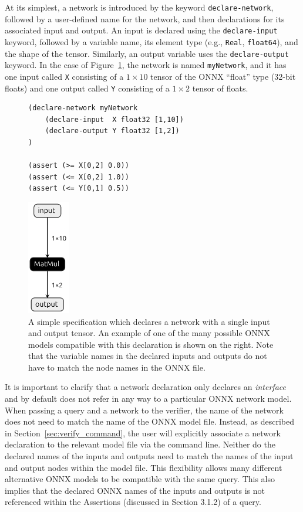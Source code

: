  At its simplest, a network is introduced by the keyword \texttt{declare-network}, followed by a user-defined name for the network, and then declarations for its associated input and output. An input is declared using the \texttt{declare-input} keyword, followed by a variable name, its element type (e.g., \texttt{Real}, \texttt{float64}), 
and the shape of the tensor. Similarly, an output variable uses the \texttt{declare-output} keyword. In the case of Figure~\ref{fig:simple-query}, the network is named \texttt{myNetwork}, and it has one input called \texttt{X} consisting of a $1 \times 10$ tensor of the ONNX ``float'' type (32-bit floats) and one output called \texttt{Y} consisting of a $1 \times 2$ tensor of floats. 
\begin{figure}[t]
    \begin{minipage}[c]{0.62\textwidth}
        \begin{lstlisting}[style=lbnf]
(declare-network myNetwork
    (declare-input  X float32 [1,10])
    (declare-output Y float32 [1,2])
)

(assert (>= X[0,2] 0.0))
(assert (<= X[0,2] 1.0))
(assert (<= Y[0,1] 0.5))\end{lstlisting}
    \end{minipage}%
    \begin{minipage}[c]{0.35\textwidth}
        \centering
        \includegraphics[height=5cm]{imgs/simple_net.onnx.png}
    \end{minipage}
    \caption{A simple \vnnlib{} specification which declares a network with a single input and output tensor. An example of one of the many possible ONNX models compatible with this declaration is shown on the right. Note that the variable names in the declared inputs and outputs do not have to match the node names in the ONNX file.}
    \label{fig:simple-query}
\end{figure}


It is important to clarify that a network declaration only declares an \emph{interface} and by default does not refer in any way to a particular ONNX network model. When passing a query and a network to the verifier, the name of the network does not need to match the name of the ONNX model file. Instead, as described in Section~\ref{sec:verify_command}, the user will explicitly associate a network declaration to the relevant model file via the command line.
Neither do the declared names of the inputs and outputs need to match the names of the input and output nodes within the model file. This flexibility allows many different alternative ONNX models to be compatible with the same query. This also implies that the declared ONNX names of the inputs and outputs is not referenced within the Assertions (discussed in Section 3.1.2) of a query.

